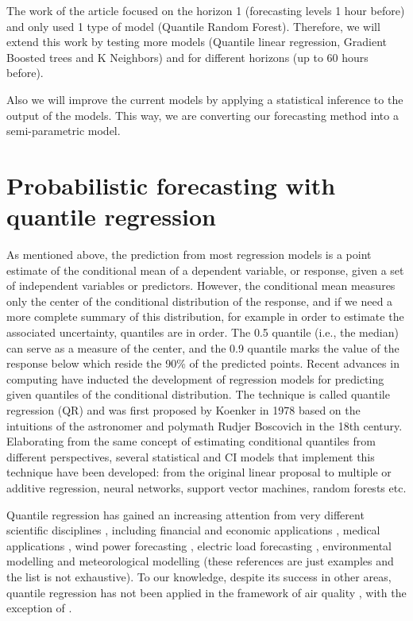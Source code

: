 \documentclass[a4paper,twocolumn,5p]{elsarticle}
\begin{document}
The work of the \cite{proba_aznarte} article focused on the horizon 1 (forecasting levels 1
hour before) and only used 1 type of model (Quantile Random Forest). Therefore, we will 
extend this work by testing more models (Quantile linear regression, Gradient Boosted trees 
and K Neighbors) and for different horizons (up to 60 hours before).

Also we will improve the current models by applying a statistical inference to the output
of the models. This way, we are converting our forecasting method into a semi-parametric 
model.

\section{Probabilistic forecasting with quantile regression}
\label{sec:probForec}

As mentioned above, the prediction from most regression models is a
point estimate of the conditional mean of a dependent variable, or
response, given a set of independent variables or predictors. However,
the conditional mean measures only the center of the conditional
distribution of the response, and if we need a more complete summary
of this distribution, for example in order to estimate the associated
uncertainty, quantiles are in order. The 0.5 quantile (i.e., the
median) can serve as a measure of the center, and the 0.9 quantile
marks the value of the response below which reside the 90\% of the
predicted points. Recent advances in computing have inducted the
development of regression models for predicting given quantiles of the
conditional distribution. The technique is called quantile regression
(QR) and was first proposed by Koenker in 1978
\cite{koenker_quantile_2001} based on the intuitions of the
astronomer and polymath Rudjer Boscovich in the 18th
century. Elaborating from the same concept of estimating conditional
quantiles from different perspectives, several statistical and CI
models that implement this technique have been developed: from the
original linear proposal to multiple or additive regression, neural
networks, support vector machines, random forests etc.

Quantile regression has gained an increasing attention from very
different scientific disciplines \cite{yu_quantile_2003}, including
financial and economic applications \cite{fitzenberger_economic_2002},
medical applications \cite{soyiri_forecasting_2012}, wind power
forecasting \cite{zhang_review_2014}, electric load forecasting
\cite{7423794,gibbons_quantile_2014}, environmental modelling
\cite{cade_gentle_2003} and meteorological modelling
\cite{bjornar_bremnes_probabilistic_2004} (these references are just
examples and the list is not exhaustive). To our knowledge, despite
its success in other areas, quantile regression has not been applied
in the framework of air quality , with the exception of
 \cite{martinez-silva_forecasting_2016}.
\end{document}
